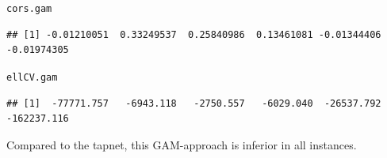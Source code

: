 \documentclass[a4paper, 11pt]{article}\usepackage[]{graphicx}\usepackage[]{color}
\makeatletter
\newcommand{\hlstd}[1]{\textcolor[rgb]{0.345,0.345,0.345}{#1}}%
\newenvironment{kframe}{%
 \def\at@end@of@kframe{}%
 \ifinner\ifhmode%
  \def\at@end@of@kframe{\end{minipage}}%
  \begin{minipage}{\columnwidth}%
 \fi\fi%
 \def\FrameCommand##1{\hskip\@totalleftmargin \hskip-\fboxsep
 \colorbox{shadecolor}{##1}\hskip-\fboxsep
     \hskip-\linewidth \hskip-\@totalleftmargin \hskip\columnwidth}%
 \MakeFramed {\advance\hsize-\width
   \@totalleftmargin\z@ \linewidth\hsize
   \@setminipage}}%
 {\par\unskip\endMakeFramed%
 \at@end@of@kframe}
\newenvironment{knitrout}{}{} %
\makeatother
\begin{document}
\begin{knitrout}\small
{}\color{fgcolor}\begin{kframe}
\begin{alltt}
\hlstd{cors.gam}
\end{alltt}
\begin{verbatim}
## [1] -0.01210051  0.33249537  0.25840986  0.13461081 -0.01344406 -0.01974305
\end{verbatim}
\begin{alltt}
\hlstd{ellCV.gam}
\end{alltt}
\begin{verbatim}
## [1]  -77771.757   -6943.118   -2750.557   -6029.040  -26537.792 -162237.116
\end{verbatim}
\end{kframe}
\end{knitrout}
Compared to the tapnet, this GAM-approach is inferior in all instances.
\end{document}
